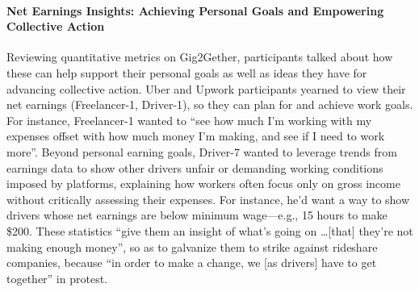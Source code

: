 \paragraph{\textbf{Net Earnings Insights: Achieving Personal Goals and Empowering Collective Action}} %

{Reviewing quantitative metrics on Gig2Gether, participants talked about how these can help support their personal goals as well as ideas they have for advancing collective action.}
Uber and Upwork participants yearned to view their net earnings (Freelancer-1, Driver-1), so they can plan for and achieve work goals. For instance, Freelancer-1 wanted to ``see how much I'm working with my expenses offset with how much money I'm making, and see if I need to work more''. Beyond personal earning goals, Driver-7 wanted to leverage trends from earnings data to show other drivers unfair or demanding working conditions imposed by platforms, explaining how workers often focus only on gross income without critically assessing their expenses. For instance, he'd want a way to show drivers whose net earnings are below minimum wage---e.g., 15 hours to make \$200. These statistics ``give them an insight of what's going on \dots [that] they're not making enough money'', so as to galvanize them to strike against rideshare companies, because ``in order to make a change, we [as drivers] have to get together'' in protest.


